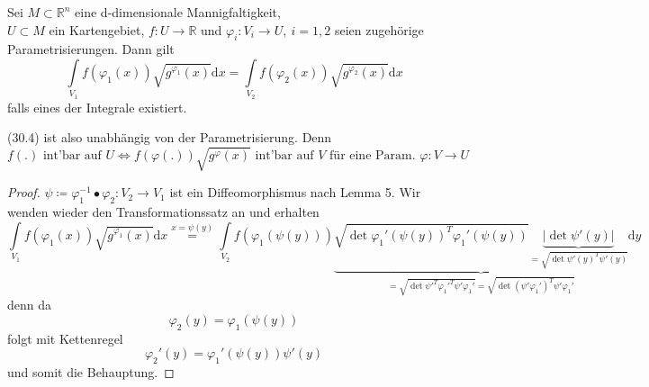 \begin{satz}
    Sei $M \subset \mathbb{R}^n $ eine d-dimensionale Mannigfaltigkeit,\\
    $U \subset M $ ein Kartengebiet, $f:U \rightarrow \mathbb{R} $ und
    $\varphi_i: V_i \rightarrow U,\ i=1,2 $ seien zugehörige Parametrisierungen. Dann gilt
    \begin{equation*}
    	\int\limits_{V_1} f(\varphi_1(x)) \sqrt{g^{\varphi_1} (x)} \mathrm{d}x
    	= \int\limits_{V_2} f(\varphi_2(x)) \sqrt{g^{\varphi_2} (x)} \mathrm{d}x
    \end{equation*}
   	falls eines der Integrale existiert.
\end{satz}

(30.4) ist also unabhängig von der Parametrisierung. Denn
\begin{equation}
    f(.) \text{ int'bar auf } U
    \Longleftrightarrow f(\varphi(.)) \sqrt{g^\varphi (x)} 
    \text{ int'bar auf } V
    \text{ für eine Param. }
    \varphi: V \rightarrow U
\end{equation}

\begin{proof}
    $\psi \coloneqq \varphi_1^{-1} \bullet \varphi_2: V_2 \rightarrow V_1 $
    ist ein Diffeomorphismus nach Lemma 5. Wir wenden wieder den Transformationssatz an und erhalten
	\begin{equation*}
		\int\limits_{V_1} f(\varphi_1(x)) \sqrt{g^{\varphi_1} (x)} \mathrm{d}x
    	\stackrel{x=\psi(y)}{=}
   	 	\int\limits_{V_2} f(\varphi_1(\psi(y)))
    	\underbrace{
        \sqrt{\det \varphi_1'(\psi(y))^T \varphi_1'(\psi(y))}
        \underbrace{
            |\det \psi'(y)|
            }_{
            = \sqrt{\det \psi'(y)^T \psi'(y)}}
        }_{
        = \sqrt{\det \psi'^T \varphi_1'^T \psi' \varphi_1'}
        = \sqrt{\det (\psi' \varphi_1')^T \psi' \varphi_1'}
        }
    	\mathrm{d}y
	\end{equation*}	    
    denn da
    \begin{equation*}
		\varphi_2 (y) = \varphi_1 (\psi(y))
	\end{equation*}	   
	folgt mit Kettenregel
	 \begin{equation*}
    	\varphi_2' (y) = \varphi_1' (\psi(y)) \psi'(y)
	\end{equation*}	 
	und somit die Behauptung.
\end{proof}
